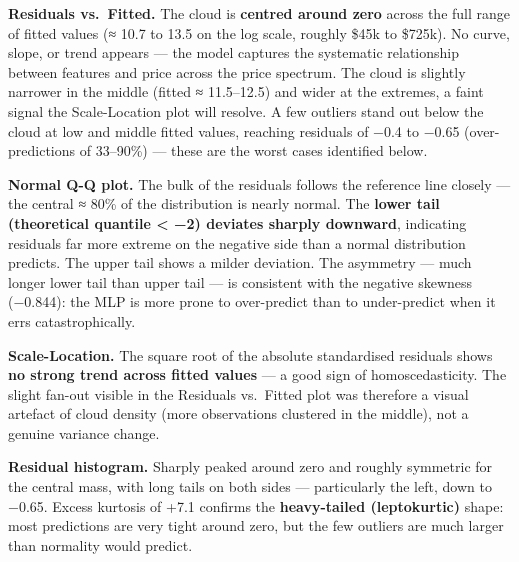 \textbf{Residuals vs.~Fitted.} The cloud is \textbf{centred around zero}
across the full range of fitted values (≈ 10.7 to 13.5 on the log scale,
roughly \$45k to \$725k). No curve, slope, or trend appears --- the
model captures the systematic relationship between features and price
across the price spectrum. The cloud is slightly narrower in the middle
(fitted ≈ 11.5--12.5) and wider at the extremes, a faint signal the
Scale-Location plot will resolve. A few outliers stand out below the
cloud at low and middle fitted values, reaching residuals of −0.4 to
−0.65 (over-predictions of 33--90\%) --- these are the worst cases
identified below.

\textbf{Normal Q-Q plot.} The bulk of the residuals follows the
reference line closely --- the central ≈ 80\% of the distribution is
nearly normal. The \textbf{lower tail (theoretical quantile \textless{}
−2) deviates sharply downward}, indicating residuals far more extreme on
the negative side than a normal distribution predicts. The upper tail
shows a milder deviation. The asymmetry --- much longer lower tail than
upper tail --- is consistent with the negative skewness (−0.844): the
MLP is more prone to over-predict than to under-predict when it errs
catastrophically.

\textbf{Scale-Location.} The square root of the absolute standardised
residuals shows \textbf{no strong trend across fitted values} --- a good
sign of homoscedasticity. The slight fan-out visible in the Residuals
vs.~Fitted plot was therefore a visual artefact of cloud density (more
observations clustered in the middle), not a genuine variance change.

\textbf{Residual histogram.} Sharply peaked around zero and roughly
symmetric for the central mass, with long tails on both sides ---
particularly the left, down to −0.65. Excess kurtosis of +7.1 confirms
the \textbf{heavy-tailed (leptokurtic)} shape: most predictions are very
tight around zero, but the few outliers are much larger than normality
would predict.

